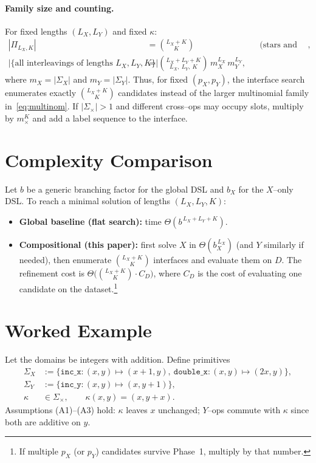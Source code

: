 \documentclass[11pt]{article}
\newcommand{\abs}[1]{\left\lvert #1 \right\rvert}
\begin{document}
\paragraph{Family size and counting.}
For fixed lengths $(L_X,L_Y)$ and fixed $\kappa$:
\begin{align}
\abs{\Pi_{L_X,K}} &= \binom{L_X+K}{K} &&\text{(stars and bars)},\\
\abs{\{ \text{all interleavings of lengths }L_X,L_Y,K\}} &= \binom{L_X+L_Y+K}{L_X,\ L_Y,\ K}\, m_X^{L_X}\, m_Y^{L_Y},\label{eq:multinom}
\end{align}
where $m_X=\abs{\Sigma_X}$ and $m_Y=\abs{\Sigma_Y}$. Thus, for fixed $(p_X,p_Y)$, the interface search enumerates exactly $\binom{L_X+K}{K}$ candidates instead of the larger multinomial family in~\eqref{eq:multinom}. If $\abs{\Sigma_\times}>1$ and different cross--ops may occupy slots, multiply by $m_\times^K$ and add a label sequence to the interface.

\section{Complexity Comparison}\label{sec:complexity}
Let $b$ be a generic branching factor for the global DSL and $b_X$ for the $X$--only DSL. To reach a minimal solution of lengths $(L_X,L_Y,K)$:
\begin{itemize}[leftmargin=1.5em]
\item \textbf{Global baseline (flat search):} time $\Theta(b^{\,L_X+L_Y+K})$.
\item \textbf{Compositional (this paper):} first solve $X$ in $\Theta(b_X^{\,L_X})$ (and $Y$ similarly if needed), then enumerate $\binom{L_X+K}{K}$ interfaces and evaluate them on $D$. The refinement cost is $\Theta\!\big(\binom{L_X+K}{K}\cdot C_D\big)$, where $C_D$ is the cost of evaluating one candidate on the dataset.\footnote{If multiple $p_X$ (or $p_Y$) candidates survive Phase~1, multiply by that number.}
\end{itemize}

\section{Worked Example}\label{sec:example}
Let the domains be integers with addition. Define primitives
\begin{align*}
\Sigma_X &:= \{\texttt{inc\_x}:(x,y)\mapsto(x{+}1,y),\ \texttt{double\_x}:(x,y)\mapsto(2x,y)\},\\
\Sigma_Y &:= \{\texttt{inc\_y}:(x,y)\mapsto(x,y{+}1)\},\\
\kappa &\in \Sigma_\times,\qquad \kappa(x,y)=(x,y{+}x).
\end{align*}
Assumptions (A1)--(A3) hold: $\kappa$ leaves $x$ unchanged; $Y$--ops commute with $\kappa$ since both are additive on $y$.
\end{document}
